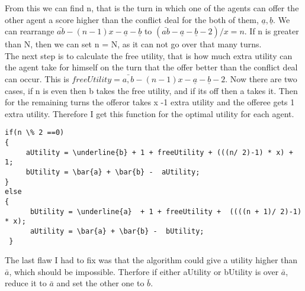 From this we can find n, that is the turn in which one of the agents can offer the other agent a score higher than the conflict deal for the both of them, ${\underline{a},\underline{b}}$. We can rearrange $\bar{ab} - (n-1)x - \underline{a} - \underline{b}$ to $(\bar{ab} - \underline{a} - \underline{b} - 2) / x = n$. If n is greater than N, then we can set n = N, as it can not go over that many turns.
\\
The next step is to calculate the free utility, that is how much extra utility can the agent take for himself on the turn that the offer better than the conflict deal can occur. This is $freeUtility = \bar{a,b} - (n-1)x - \underline{a} - \underline{b} - 2$. Now there are two cases, if n is even then b takes the free utility, and if its off then a takes it. Then for the remaining turns the offeror takes x -1 extra utility and the offeree gets 1 extra utility. Therefore I get this function for the optimal utility for each agent.
\begin{lstlisting}
if(n \% 2 ==0)
{
     aUtility = \underline{b} + 1 + freeUtility + (((n/ 2)-1) * x) + 1;
     bUtility = \bar{a} + \bar{b} -  aUtility;
}
else
{
      bUtility = \underline{a}  + 1 + freeUtility +  ((((n + 1)/ 2)-1) * x);
      aUtility = \bar{a} + \bar{b} -  bUtility;
 }
\end{lstlisting}
The last flaw I had to fix was that the algorithm could give a utility higher than $\bar{a}$, which should be impossible. Therfore if either aUtility or bUtility is over $\bar{a}$, reduce it to $\bar{a}$ and set the other one to $\bar{b}$. 





